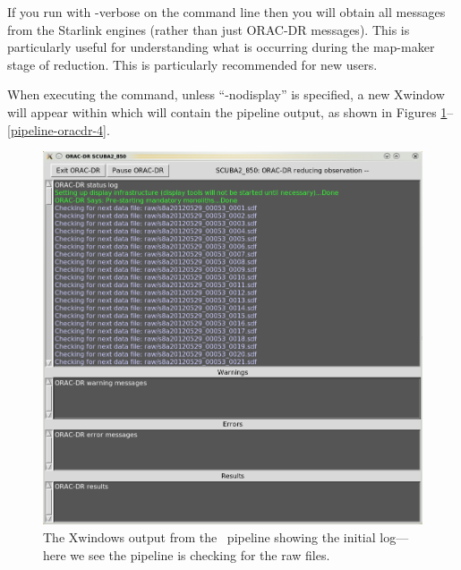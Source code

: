 \begin{tip}
  If you run with -verbose on the command line then you will obtain all messages
 from the Starlink engines (rather than just ORAC-DR messages). This is
 particularly useful for understanding what is occurring during the map-maker stage
 of reduction. This is particularly recommended for new users.
\end{tip}

When executing the \oracdr command, unless ``-nodisplay'' is specified,
a new Xwindow will appear within which
will contain the pipeline output, as shown in Figures
\ref{pipeline-oracdr-1}--\ref{pipeline-oracdr-4}.

\begin{figure}
\begin{center}
\includegraphics[width=0.7\linewidth]{sc21-pipeline-oracdr-1}
\caption[Output from the pipeline]{The Xwindows output from the \oracdr\
pipeline showing the initial log---here we see the pipeline is checking
for the raw files. \label{pipeline-oracdr-1}}
\end{center}
\end{figure}

